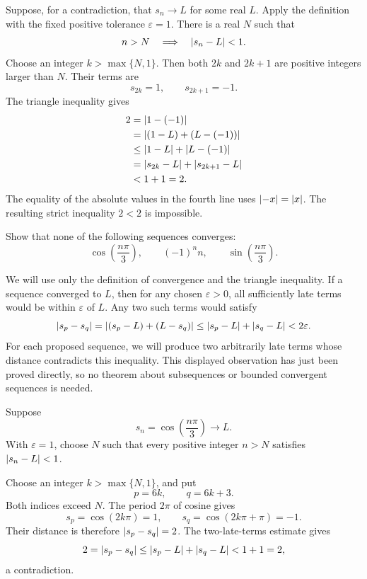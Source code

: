 Suppose, for a contradiction, that $s_n\to L$ for some real $L$.
Apply the definition with the fixed positive tolerance $\varepsilon=1$.
There is a real $N$ such that
\[
 n>N\quad\Longrightarrow\quad\left|s_n-L\right|<1.
\]
Choose an integer $k>\max\{N,1\}$. Then both $2k$ and $2k+1$ are
positive integers larger than $N$. Their terms are
\[
 s_{2k}=1,\qquad s_{2k+1}=-1.
\]
The triangle inequality gives
\begin{align*}
 2
   &=\left|1-(-1)\right|\\
   &=\left|(1-L)+(L-(-1))\right|\\
   &\le\left|1-L\right|+\left|L-(-1)\right|\\
   &=\left|s_{2k}-L\right|+\left|s_{2k+1}-L\right|\\
   &<1+1=2.
\end{align*}
The equality of the absolute values in the fourth line uses
$\left|-x\right|=\left|x\right|$. The resulting strict inequality $2<2$ is impossible.



\goal Show that none of the following sequences converges:
\[
 \cos\left(\frac{n\pi}{3}\right),\qquad
 (-1)^n n,\qquad
 \sin\left(\frac{n\pi}{3}\right).
\]

\idea We will use only the definition of convergence and the triangle
inequality. If a sequence converged to $L$, then for any chosen
$\varepsilon>0$, all sufficiently late terms would be within
$\varepsilon$ of $L$. Any two such terms would satisfy
\[
 \left|s_p-s_q\right|
  =\left|(s_p-L)+(L-s_q)\right|
  \le\left|s_p-L\right|+\left|s_q-L\right|
  <2\varepsilon.
\]
For each proposed sequence, we will produce two arbitrarily late terms
whose distance contradicts this inequality. This displayed observation
has just been proved directly, so no theorem about subsequences or
bounded convergent sequences is needed.

Suppose
\[
 s_n=\cos\left(\frac{n\pi}{3}\right)\to L.
\]
With $\varepsilon=1$, choose $N$ such that every positive integer
$n>N$ satisfies $\left|s_n-L\right|<1$.

Choose an integer $k>\max\{N,1\}$, and put
\[
 p=6k,\qquad q=6k+3.
\]
Both indices exceed $N$. The period $2\pi$ of cosine gives
\[
 s_p=\cos(2k\pi)=1,\qquad
 s_q=\cos(2k\pi+\pi)=-1.
\]
Their distance is therefore $\left|s_p-s_q\right|=2$.
The two-late-terms estimate gives
\[
 2=\left|s_p-s_q\right|
   \le\left|s_p-L\right|+\left|s_q-L\right|
   <1+1=2,
\]
a contradiction.

